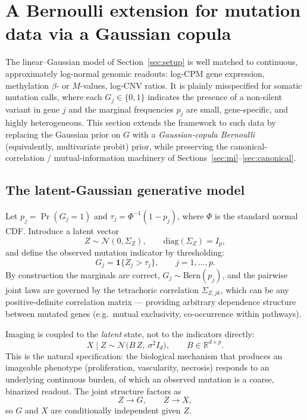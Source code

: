\documentclass{article}
\newcommand{\R}{\mathbb{R}}
\begin{document}
\section{A Bernoulli extension for mutation data via a Gaussian copula}
\label{sec:bernoulli}

The linear--Gaussian model of Section~\ref{sec:setup} is well matched to
continuous, approximately log-normal genomic readouts: log-CPM gene expression,
methylation $\beta$- or $M$-values, log-CNV ratios. It is plainly misspecified
for somatic mutation calls, where each $G_j \in \{0,1\}$ indicates the presence
of a non-silent variant in gene $j$ and the marginal frequencies $p_j$ are
small, gene-specific, and highly heterogeneous. This section extends the
framework to such data by replacing the Gaussian prior on $G$ with a
\emph{Gaussian-copula Bernoulli} (equivalently, multivariate probit) prior,
while preserving the canonical-correlation / mutual-information machinery of
Sections~\ref{sec:mi}--\ref{sec:canonical}.

\subsection{The latent-Gaussian generative model}
\label{sec:bern-model}

Let $p_j = \Pr(G_j = 1)$ and $\tau_j = \Phi^{-1}(1-p_j)$, where $\Phi$ is the
standard normal CDF. Introduce a latent vector
\[
  Z \sim \mathcal N(0, \Sigma_Z), \qquad
  \mathrm{diag}(\Sigma_Z) = I_p,
\]
and define the observed mutation indicator by thresholding:
\[
  G_j = \mathbf{1}\!\{Z_j > \tau_j\}, \qquad j = 1,\ldots,p.
\]
By construction the marginals are correct, $G_j \sim \mathrm{Bern}(p_j)$, and
the pairwise joint laws are governed by the tetrachoric correlation $\Sigma_{Z,jk}$,
which can be any positive-definite correlation matrix --- providing arbitrary
dependence structure between mutated genes (e.g.\ mutual exclusivity,
co-occurrence within pathways).

Imaging is coupled to the \emph{latent} state, not to the indicators directly:
\begin{equation}
  X \mid Z \sim \mathcal N\!\bigl(B\,Z,\ \sigma^2 I_d\bigr),
  \qquad
  B \in \R^{d \times p}.
  \label{eq:bern-channel}
\end{equation}
This is the natural specification: the biological mechanism that produces an
imageable phenotype (proliferation, vascularity, necrosis) responds to an
underlying continuous burden, of which an observed mutation is a coarse,
binarized readout. The joint structure factors as
\[
  Z \to G,\qquad Z \to X,
\]
so $G$ and $X$ are conditionally independent given $Z$.
\end{document}
